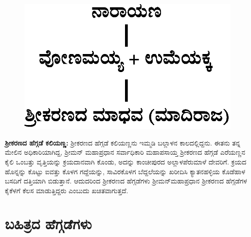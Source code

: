 \begin{figure}[H]
\includegraphics[scale=1.3]{images/chap3/chap3fig30.jpeg}
\end{figure}

\textbf{ಶ‍್ರೀಕರಣದ ಹೆಗ್ಗಡೆ ಕಲಿಯಣ್ಣ:} ಶ‍್ರೀಕರಣದ ಹೆಗ್ಗಡೆ ಕಲಿಯಣ್ಣನು ಇಮ್ಮಡಿ ಬಲ್ಲಾಳನ ಕಾಲದಲ್ಲಿದ್ದನು. ಈತನು ತನ್ನ ಮೇಲಿನ ಅಧಿಕಾರಿಯಾಗಿದ್ದ, ಶ‍್ರೀಮನ್​ ಮಹಾಪ್ರಧಾನ ಸರ್ವಾಧಿಕಾರಿ ಮಹಾಪಸಾಯ್ತ ಶ‍್ರೀಕರಣದ ಹೆಗ್ಗಡೆ ಎರೆಯಣ್ಣನ ಕೈಲಿ ಒಂಬತ್ತು ವೃತ್ತಿಯನ್ನು ಕ್ರಯದಾನವಾಗಿ ಕೊಂಡು, ಅದನ್ನು ಕಾಂಚೀಪುರದ ಅಲ್ಲಾಳಪೆರುಮಾಳೆ ದೇವರಿಗೆ. ಕ್ರಯದ ಹೊನ್ನನ್ನು ಕೊಟ್ಟು ಐವತ್ತು ಕೊಳಗ ಗದ್ದೆಯನ್ನು, ಸಾವಿರಕೊಳಗ ಬೆದ್ದಲೆಯನ್ನು ಖರೀದಿಸಿ ಕ್ಯಾತನಹಳ್ಳಿಯ ಕೊಡೆಹಾಳ ಬಸದಿಗೆ ದತ್ತಿಯಾಗಿ ಬಿಡುತ್ತಾನೆ. ಆದುದರಿಂದ ಶ‍್ರೀಕರಣದ ಹೆಗ್ಗಡೆಗಳು ಶ‍್ರೀಮನ್​ಮಹಾಪ್ರಧಾನ ಶ‍್ರೀಕರಣದ ಹೆಗ್ಗಡೆಗಳ ಕೈಕೆಳಗೆ ಕೆಲಸ ಮಾಡುತ್ತಿದ್ದರು ಎಂಬುದು ಖಚಿತವಾಗುತ್ತದೆ.


\section{ಬಹಿತ್ರದ ಹೆಗ್ಗಡೆಗಳು}

